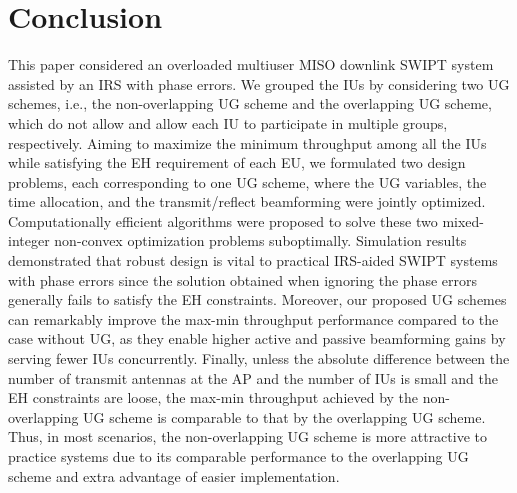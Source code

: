 \documentclass[12pt,draftclsnofoot, onecolumn]{IEEEtran}
\theoremstyle{plain}
\begin{document}
\begin{sloppypar}
\section{Conclusion}\label{Sec:conclusion}
This paper considered an overloaded multiuser MISO downlink SWIPT system assisted by an IRS with phase errors. We grouped the IUs by considering two UG schemes, i.e., the non-overlapping UG scheme and the overlapping UG scheme, which do not allow and allow each IU to participate in multiple groups, respectively. Aiming to maximize the minimum throughput among all the IUs while satisfying the EH requirement of each EU, we formulated two design problems, each corresponding to one UG scheme, where the UG variables, the time allocation, and the transmit/reflect beamforming were jointly optimized. Computationally efficient algorithms were proposed to solve these two mixed-integer non-convex optimization problems suboptimally. Simulation results demonstrated that robust design is vital to practical IRS-aided SWIPT systems with phase errors since the solution obtained when ignoring the phase errors generally fails to satisfy the EH constraints.  
Moreover, our proposed UG schemes can remarkably improve the max-min throughput performance compared to the case without UG, as they enable higher active and passive beamforming gains by serving fewer IUs concurrently. %
Finally, unless the absolute difference between the number of transmit antennas at the AP and the number of IUs is small and the EH constraints are loose, the max-min throughput achieved by the non-overlapping UG scheme is comparable to that by the overlapping UG scheme. Thus, in most scenarios, the non-overlapping UG scheme is more attractive to practice systems due to its comparable performance to the overlapping UG scheme and extra advantage of easier implementation. %


\appendices

\end{sloppypar}
\end{document}
